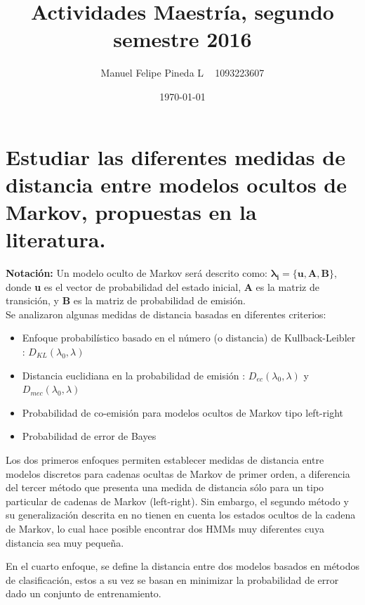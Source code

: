 \documentclass[a4paper]{article}
\title{Actividades Maestría, segundo semestre 2016}
\author{Manuel Felipe Pineda L ~ 1093223607}
\date{\today}
\begin{document}
\maketitle

\section{Estudiar las diferentes medidas de distancia entre
modelos ocultos de Markov, propuestas en la literatura.}
\label{sec:introduction}

\textbf{Notación:} Un modelo oculto de Markov será descrito como:
$\mathbf{\lambda_{i}} = \{\mathbf{u}, \mathbf{A}, \mathbf{B}\}$, donde
\textbf{u} es el vector de probabilidad del estado inicial, \textbf{A}
es la matriz de transición, y \textbf{B} es la matriz de probabilidad
de emisión. \\

Se analizaron algunas medidas de distancia basadas en diferentes criterios:

\begin{itemize}
  \item Enfoque probabilístico basado en el número (o distancia)
    de Kullback-Leibler \cite{1985} \cite{1995calculation} \cite{2005probabilistic}: $D_{KL}(\lambda_0, \lambda)$

  \item Distancia euclidiana en la probabilidad de emisión
    \cite{1995calculation} : $D_{ec}(\lambda_0, \lambda)$ y
    $D_{mec}(\lambda_0, \lambda)$

  \item Probabilidad de co-emisión para modelos ocultos de Markov
    tipo left-right  \cite{1999metrics}

  \item Probabilidad de error de Bayes \cite{2001measuring}
\end{itemize}

Los dos primeros enfoques permiten establecer medidas de distancia
entre modelos discretos para cadenas ocultas de Markov de primer
orden, a diferencia del tercer método que presenta una medida de
distancia sólo para un tipo particular de cadenas de Markov
(left-right). Sin embargo, el segundo método y su generalización
descrita en \cite{1995calculation} no tienen en cuenta los estados
ocultos de la cadena de Markov, lo cual hace posible encontrar dos
HMMs muy diferentes cuya distancia sea muy pequeña.

En el cuarto enfoque, se define la distancia entre dos modelos
basados en métodos de clasificación, estos a su vez se basan en
minimizar la probabilidad de error dado un conjunto de entrenamiento.
\end{document}
